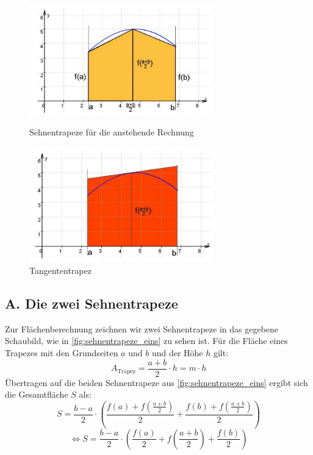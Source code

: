 \begin{figure}[!tbp]
    \centering
    \begin{minipage}[b]{0.4\textwidth}
        \includegraphics[width=8cm]{Bilder/sehnentrapeze.png}
      \caption{Sehnentrapeze für die anstehende Rechnung}
      \label{fig:sehnentrapeze_eins}
    \end{minipage}
    \hfill
    \begin{minipage}[b]{0.4\textwidth}
        \includegraphics[width=8cm]{Bilder/sehnentrapez_addiert.png}
      \caption{Tangententrapez  \cite{skript}}
      \label{fig:sehnentrapeze_zwei}
    \end{minipage}
    \label{fig:sehnentrapeze}
  \end{figure}
\subsection*{A. Die zwei Sehnentrapeze}

Zur Flächenberechnung zeichnen wir zwei Sehnentrapeze in das gegebene Schaubild, wie in \autoref{fig:sehnentrapeze_eins} zu sehen ist. Für die Fläche eines Trapezes mit den Grundseiten $a$ und $b$ und der Höhe $h$ gilt:
\[
A_{\text{Trapez}} = \frac{a + b}{2} \cdot h = m \cdot h
\]
Übertragen auf die beiden Sehnentrapeze aus \autoref{fig:sehnentrapeze_eins} ergibt sich die Gesamtfläche $S$ als:
\[
S = \frac{b - a}{2} \cdot \left( \frac{f(a) + f\left( \frac{a + b}{2} \right)}{2} + \frac{f(b) + f\left( \frac{a + b}{2} \right)}{2} \right)
\]
\[
  \Leftrightarrow S = \frac{b - a}{2} \cdot \left(\frac{f(a)}{2} + f\left(\frac{a + b}{2}\right) + \frac{f(b)}{2}\right)
\]

